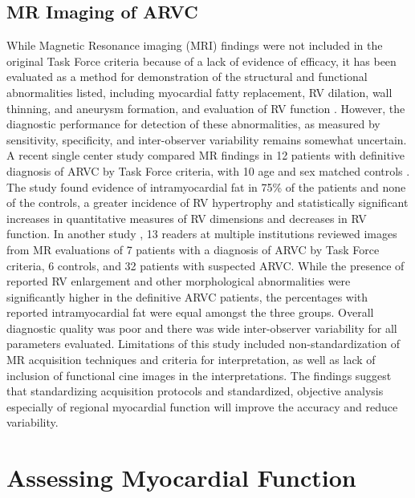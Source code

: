 \subsection{MR Imaging of ARVC}
While Magnetic Resonance imaging (MRI) findings were not included in the original Task Force criteria because of a lack of evidence of efficacy, it has been evaluated as a method for demonstration of the structural and functional abnormalities listed, including myocardial fatty replacement, RV dilation, wall thinning, and aneurysm formation, and evaluation of RV function \cite{bluemke03}. However, the diagnostic performance for detection of these abnormalities, as measured by sensitivity, specificity, and inter-observer variability remains somewhat uncertain. A recent single center study compared MR findings in 12 patients with definitive diagnosis of ARVC by Task Force criteria, with 10 age and sex matched controls \cite{tandri2003mri}. The study found evidence of intramyocardial fat in 75\% of the patients and none of the controls, a greater incidence of RV hypertrophy and statistically significant increases in quantitative measures of RV dimensions and decreases in RV function. In another study \cite{bluemke03}, 13 readers at multiple institutions reviewed images from MR evaluations of 7 patients with a diagnosis of ARVC by Task Force criteria, 6 controls, and 32 patients with suspected ARVC. While the presence of reported RV enlargement and other morphological abnormalities were significantly higher in the definitive ARVC patients, the percentages with reported intramyocardial fat were equal amongst the three groups. Overall diagnostic quality was poor and there was wide inter-observer variability for all parameters evaluated. Limitations of this study included non-standardization of MR acquisition techniques and criteria for interpretation, as well as lack of inclusion of functional cine images in the interpretations. The findings suggest that standardizing acquisition protocols and standardized, objective analysis especially of regional myocardial function will improve the accuracy and reduce variability.

\section{Assessing Myocardial Function}

